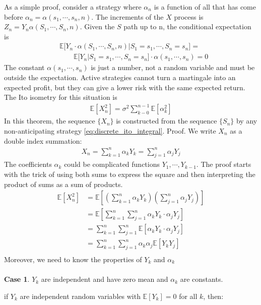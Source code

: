 As a simple proof, consider a strategy where $\alpha_n$ is a function of all that has come before $\alpha_n=\alpha(s_1, \cdots, s_n, n)$. The increments of the $X$ process is $Z_n=Y_n\alpha(S_1,\cdots,S_n, n)$. Given the $S$ path up to n, the conditional expectation is
\begin{align*}
&\mathbb{E}\big[Y_n\cdot\alpha(S_1,\cdots,S_n, n) | S_1=s_1, \cdots, S_n=s_n\big]  = \\
&\qquad \mathbb{E}\big[ Y_n \big| S_1=s_1,\cdots, S_n=s_n \big] \cdot \alpha(s_1,\cdots,s_n)=0
\end{align*}
The constant $\alpha (s_1,\cdots, s_n)$ is just a number, not a random variable and must be outside  the expectation. Active strategies cannot turn a martingale into an expected profit, but they can give a lower risk with the same expected return. The Ito isometry for this situation is 
\begin{align}\label{eq:ito_isometry}
\mathbb{E}[X_n^2] = \sigma^2 \sum_{k-0}^{n-1} \mathbb{E}[\alpha_k^2]
\end{align}
In this theorem, the sequence $\{X_n\}$ is constructed from the sequence $\{S_n\}$ by any non-anticipating strategy \eqref{eq:discrete_ito_integral}.
Proof. We write $X_n$ as a double index summation:
\begin{align*}
X_n=\sum_{k=1}^n \alpha_kY_k  = \sum_{j=1}^n \alpha_jY_j 
\end{align*}
The coefficients $\alpha_k$ could be complicated functions $Y_1, \cdots, Y_{k-1}$.  The proof starts with the trick of using both sums to express the square and then interpreting the product of sums as a sum of products.
\begin{align*}
\mathbb{E}[X_n^2] &= \mathbb{E}\left[\left(\sum_{k=1}^n \alpha_kY_k\right)\left(\sum_{j=1}^n \alpha_jY_j\right)\right]\\
&= \mathbb{E}\left[\sum_{k=1}^n\sum_{j=1}^n \alpha_kY_k\cdot\alpha_jY_j\right] \\
&= \sum_{k=1}^n\sum_{j=1}^n \mathbb{E}\left[\alpha_kY_k\cdot\alpha_jY_j \right]\\
&= \sum_{k=1}^n\sum_{j=1}^n \alpha_k \alpha_j\mathbb{E}\left[Y_k
Y_j \right]\\
\end{align*}
Moreover, we need to know the properties of $Y_k$ and $\alpha_k$
\\
\\
\textbf{Case 1}. $Y_k$ are independent and have zero mean and $\alpha_k$ are constants.

if $Y_k$ are independent random variables with $\mathbb{E}[Y_k] = 0$ for all $k$, then:

